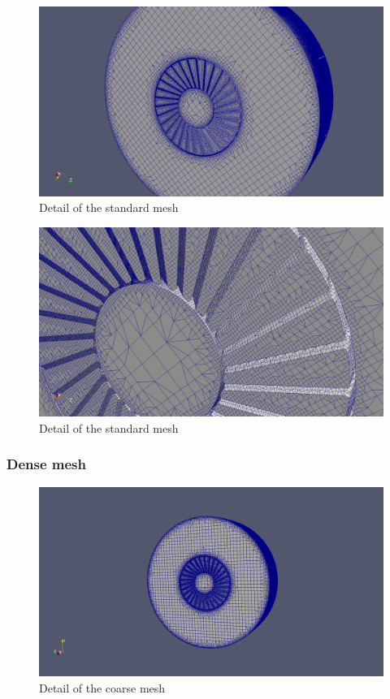
\begin{figure}[h!]
\includegraphics[scale=0.26]{./mesh/screenshots/std2}
\centering
\caption{Detail of the standard mesh}
\end{figure}

\begin{figure}[h!]
\includegraphics[scale=0.26]{./mesh/screenshots/std3}
\centering
\caption{Detail of the standard mesh}
\end{figure}

\subsubsection{Dense mesh}

\begin{figure}[h!]
\includegraphics[scale=0.26]{./mesh/screenshots/Xtreme1}
\centering
\caption{Detail of the coarse mesh}
\end{figure}

